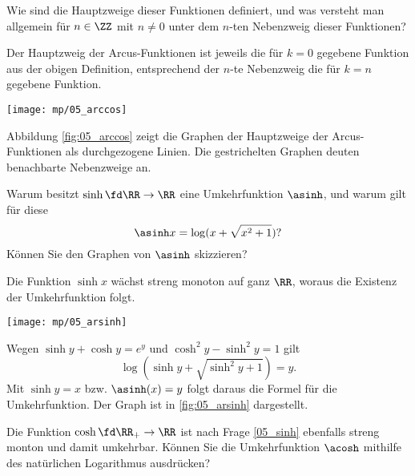 \begin{frage}
  Wie sind die Hauptzweige dieser Funktionen definiert, und was versteht 
  man allgemein für $n\in\ZZ$ mit $n\not=0$ 
  unter dem $n$-ten Nebenzweig dieser Funktionen? 
\end{frage}

\begin{antwort}
  Der Hauptzweig der Arcus-Funktionen ist jeweils die für $k=0$ gegebene 
  Funktion aus der obigen Definition, entsprechend der $n$-te Nebenzweig 
  die für $k=n$ gegebene Funktion. 

  \begin{center}
    \texttt{[image: mp/05\_arccos]}
    \label{fig:05_arccos}
  \end{center}

  Abbildung \ref{fig:05_arccos} zeigt die Graphen der Hauptzweige 
  der Arcus-Funktionen als durchgezogene Linien. Die gestrichelten Graphen 
  deuten benachbarte Nebenzweige an. 
  \AntEnd
\end{antwort}

\begin{frage}
  Warum besitzt $\sinh\fd \RR\to \RR$ eine Umkehrfunktion $\asinh$, 
  und warum gilt für diese 
  \[
  \asinh x = \log(x+\sqrt{x^2+1}) \text{?}
  \] 
  Können Sie den Graphen von $\asinh$ skizzieren?
\end{frage}


\begin{antwort}
  Die Funktion $\sinh x$ wächst streng monoton auf ganz $\RR$, 
  woraus die Existenz der Umkehrfunktion folgt. 
  \begin{center}
    \texttt{[image: mp/05\_arsinh]}
    \label{fig:05_arsinh}
  \end{center}
  Wegen $\sinh y+\cosh y=e^y$ und $\cosh^2 y- \sinh^2 y=1$ gilt
  \[
  \log ( \sinh y + \sqrt{ \sinh^2 y+ 1} )= y.
  \]
  \noindent
  Mit $\sinh y=x$ bzw. $\asinh(x)=y$ folgt daraus die Formel 
  für die Umkehrfunktion. Der Graph ist in \Abb\ref{fig:05_arsinh} dargestellt.
  \AntEnd
\end{antwort}

\begin{frage}
  Die Funktion $\cosh \fd \RR_+ \to \RR$ ist nach Frage 
  \ref{05_sinh} ebenfalls streng 
  monton und damit umkehrbar. Können Sie die Umkehrfunktion $\acosh$ mithilfe 
  des natürlichen Logarithmus ausdrücken?
\end{frage}


